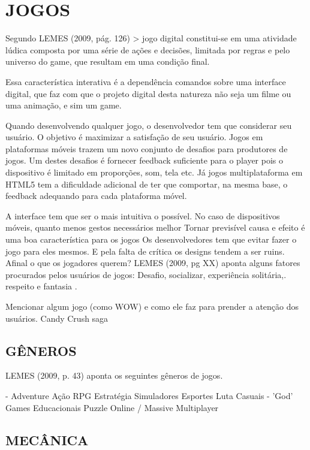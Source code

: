 \documentclass[11pt,a4paper]{article}
\begin{document}
\section{JOGOS}
Segundo LEMES (2009, pág. 126) > jogo digital constitui-se em uma
atividade lúdica composta por uma série de ações e decisões,
limitada por regras e pelo universo do game, que resultam em uma
condição final.

Essa característica interativa é a dependência comandos
sobre uma interface digital, que faz com que o projeto digital desta
natureza não seja um filme ou uma animação, e sim um game.

Quando desenvolvendo qualquer jogo, o desenvolvedor tem que considerar
seu usuário. O objetivo é maximizar a satisfação de seu usuário.
Jogos em plataformas móveis trazem um novo conjunto de desafios para
produtores de jogos. Um destes desafios é fornecer feedback suficiente
para o player pois o dispositivo é limitado em proporções, som, tela
etc. Já jogos multiplataforma em HTML5 tem a dificuldade adicional
de ter que comportar, na mesma base, o feedback adequando para cada
plataforma móvel.

A interface tem que ser o mais intuitiva o possível. No caso de       
dispositivos móveis, quanto menos gestos necessários melhor Tornar   
previsível causa e efeito é uma boa característica para os jogos    
Os desenvolvedores tem que evitar fazer o jogo para eles mesmos. E     
pela falta de crítica os designs tendem a ser ruins. Afinal o que os  
jogadores querem? LEMES (2009, pg XX) aponta alguns fatores procurados
pelos usuários de jogos: Desafio, socializar, experiência solitária,.
respeito e fantasia                                                    .

Mencionar algum jogo (como WOW) e como ele faz para prender a
atenção dos usuários. Candy Crush saga 

\subsection{GÊNEROS}

LEMES (2009, p. 43) aponta os seguintes gêneros de jogos.

- Adventure Ação RPG Estratégia Simuladores Esportes Luta Casuais
- 'God' Games Educacionais Puzzle Online / Massive Multiplayer

\subsection{MECÂNICA}
\end{document}
